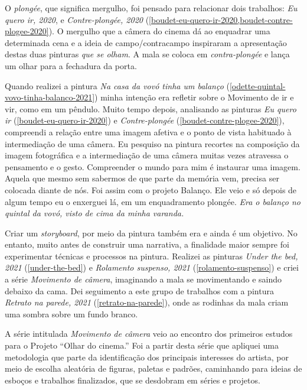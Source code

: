 O \emph{plongée}, que significa mergulho, foi pensado para relacionar
dois trabalhos: \emph{Eu quero ir, 2020}, e \emph{Contre-plongée,
2020} (\cref{boudet-eu-quero-ir-2020,boudet-contre-plogee-2020}). O mergulho que a câmera do cinema dá ao enquadrar uma
determinada cena e a ideia de campo/contracampo inspiraram a
apresentação destas duas pinturas \emph{que se olham}. A mala se coloca
em \emph{contra-plongée} e lança um olhar para a fechadura da porta.

Quando realizei a pintura \emph{Na casa da vovó tinha um balanço}
(\cref{odette-quintal-vovo-tinha-balanco-2021}) minha intenção era
refletir sobre o Movimento de ir e vir, como em um pêndulo. Muito tempo
depois, analisando as pinturas \emph{Eu quero ir}
(\cref{boudet-eu-quero-ir-2020}) e \emph{Contre-plongée}
(\cref{boudet-contre-plogee-2020}), compreendi a relação entre uma
imagem afetiva e o ponto de vista habituado à intermediação de uma
câmera. Eu pesquiso na pintura recortes na composição da imagem
fotográfica e a intermediação de uma câmera muitas vezes atravessa o
pensamento e o gesto. Compreender o mundo para mim é instaurar uma
imagem. Aquela que mesmo sem sabermos de que parte da memória vem,
precisa ser colocada diante de nós. Foi assim com o projeto Balanço.
Ele veio e só depois de algum tempo eu o enxerguei lá, em um
enquadramento plongée. \emph{Era o balanço no quintal da vovó, visto de
	cima da minha varanda.}

Criar um \emph{storyboard}, por meio da pintura também era e ainda é um
objetivo. No entanto, muito antes de construir uma narrativa, a
finalidade maior sempre foi experimentar técnicas e processos na
pintura. Realizei as pinturas \emph{Under the bed, 2021} (\cref{under-the-bed}) e
\emph{Rolamento suspenso, 2021} (\cref{rolamento-suspenso}) e criei a série \emph{Movimento de
	câmera}, imaginando a mala se movimentando e saindo debaixo da cama.
Dei seguimento a este grupo de trabalhos com a pintura \emph{Retrato na
parede, 2021} (\cref{retrato-na-parede}), onde as rodinhas da mala criam uma sombra sobre um fundo
branco.

A série intitulada \emph{Movimento de câmera} veio ao encontro dos
primeiros estudos para o Projeto \enquote{Olhar do cinema.} Foi a
partir desta série que apliquei uma metodologia que parte da
identificação dos principais interesses do artista, por meio de escolha
aleatória de figuras, paletas e padrões, caminhando para ideias de
esboços e trabalhos finalizados, que se desdobram em séries e projetos.

\newpage

